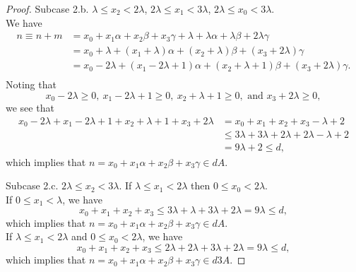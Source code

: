 \begin{proof}
Subcase 2.b. $\lambda \leq x_2 < 2 \lambda$, $2 \lambda \leq x_1 < 3\lambda$,  $2\lambda \leq x_0 < 3\lambda$. \\
We have
\begin{align*}
n \equiv n + m &= x_0 + x_1\alpha + x_2\beta + x_3\gamma + \lambda + \lambda \alpha + \lambda \beta + 2 \lambda \gamma\\
&=  x_0 + \lambda + (x_1 + \lambda) \alpha + (x_2 + \lambda) \beta + (x_3 + 2 \lambda) \gamma\\ 
&=  x_0 -  2\lambda + (x_1 - 2 \lambda + 1) \alpha + (x_2 + \lambda + 1) \beta + (x_3 + 2 \lambda)
 \gamma.\\ 
\end{align*}
Noting that
\[  x_0 -  2\lambda \geq 0, \  x_1 - 2 \lambda + 1 \geq 0,  \ x_2 + \lambda + 1 \geq 0, \text{ and } x_3 + 2 \lambda \geq 0, \]
we see that 
\begin{align*}
x_0 -  2\lambda + x_1 - 2 \lambda + 1 + x_2 + \lambda + 1 + x_3 + 2 \lambda &= x_0  + x_1 +  x_2 + x_3 -  \lambda + 2 \\
&\leq 3 \lambda + 3 \lambda + 2 \lambda + 2\lambda - \lambda + 2\\
&= 9 \lambda + 2 \leq d,
\end{align*}
which implies that $n = x_0 + x_1\alpha + x_2\beta + x_3\gamma \in dA$. 

Subcase 2.c. $2 \lambda \leq x_2 < 3 \lambda.$ If $ \lambda \leq x_1 < 2 \lambda$ then $0 \leq x_0 < 2\lambda$. \\
If $0 \leq x_1 < \lambda$, we have 
\[ x_0 + x_1 + x_2 + x_3 \leq 3\lambda + \lambda + 3 \lambda + 2\lambda = 9\lambda \leq d, \]
which implies that $n = x_0 + x_1\alpha + x_2\beta + x_3\gamma \in dA$. \\
If $ \lambda \leq x_1 < 2 \lambda$ and  $0 \leq x_0 < 2\lambda$, we have 
\[ x_0 + x_1 + x_2 + x_3 \leq 2\lambda + 2\lambda + 3\lambda + 2 \lambda = 9\lambda \leq d, \]
which implies that $n = x_0 + x_1\alpha + x_2\beta + x_3\gamma \in d3A$. 


\end{proof}
